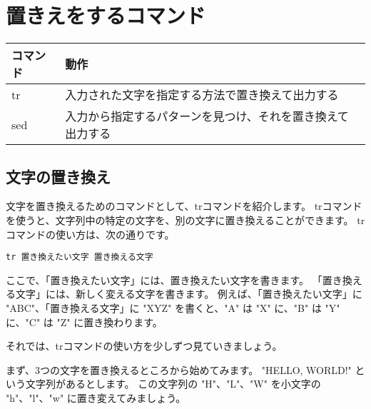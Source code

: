 \begin{tcolorbox}[title=\useOmetoi]
    \begin{enumerate}
    \end{enumerate}
\end{tcolorbox}



\newpage
\section{置きえをするコマンド}
\begin{tabular}{ll}
    コマンド & 動作                                                       \\ \hline
    tr       & 入力された文字を指定する方法で置き換えて出力する           \\
    sed      & 入力から指定するパターンを見つけ、それを置き換えて出力する \\ \hline
\end{tabular}


\subsection{文字の置き換え}
文字を置き換えるためのコマンドとして、trコマンドを紹介します。
trコマンドを使うと、文字列中の特定の文字を、別の文字に置き換えることができます。
trコマンドの使い方は、次の通りです。

\begin{lstlisting}[caption=trコマンドの使い方, label=tr_basic_usage]
tr 置き換えたい文字 置き換える文字
\end{lstlisting}

ここで、「置き換えたい文字」には、置き換えたい文字を書きます。
「置き換える文字」には、新しく変える文字を書きます。
例えば、「置き換えたい文字」に "ABC"、「置き換える文字」に "XYZ" を書くと、"A" は "X" に、"B" は "Y" に、"C" は "Z"
に置き換わります。

それでは、trコマンドの使い方を少しずつ見ていきましょう。

まず、3つの文字を置き換えるところから始めてみます。
"HELLO, WORLD!" という文字列があるとします。
この文字列の "H"、"L"、"W" を小文字の "h"、"l"、"w" に置き変えてみましょう。

